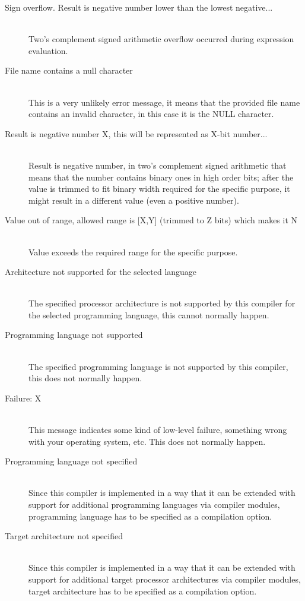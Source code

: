 \begin{description}
        \item[Sign overflow. Result is negative number lower than the lowest negative...]~\\
            Two's complement signed arithmetic overflow occurred during expression evaluation.
        \item[File name contains a null character]~\\
            This is a very unlikely error message, it means that the provided file name contains an invalid character, in this case it is the NULL character.
        \item[Result is negative number X, this will be represented as X-bit number...]~\\
            Result is negative number, in two's complement signed arithmetic that means that the number contains binary ones in high order bits; after the value is trimmed to fit binary width required for the specific purpose, it might result in a different value (even a positive number).
        \item[Value out of range, allowed range is {[X,Y]} (trimmed to Z bits) which makes it N]~\\
            Value exceeds the required range for the specific purpose.
        \item[Architecture not supported for the selected language]~\\
            The specified processor architecture is not supported by this compiler for the selected programming language, this cannot normally happen.
        \item[Programming language not supported]~\\
            The specified programming language is not supported by this compiler, this does not normally happen.
        \item[Failure: X]~\\
            This message indicates some kind of low-level failure, something wrong with your operating system, etc. This does not normally happen.
        \item[Programming language not specified]~\\
            Since this compiler is implemented in a way that it can be extended with support for additional programming languages via compiler modules, programming language has to be specified as a compilation option.
        \item[Target architecture not specified]~\\
            Since this compiler is implemented in a way that it can be extended with support for additional target processor architectures via compiler modules, target architecture has to be specified as a compilation option.

\end{description}
